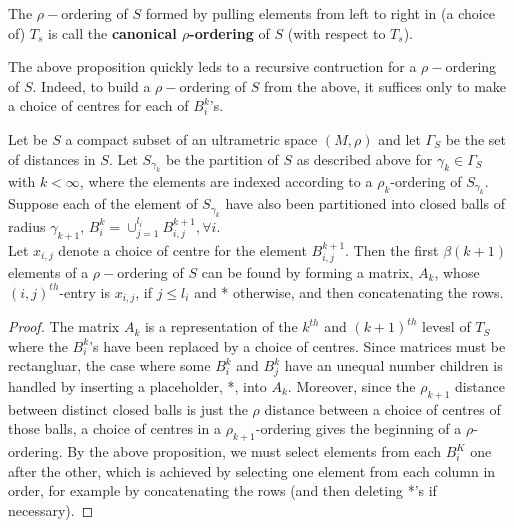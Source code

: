 \begin{definition*}
The $\rho-$ordering of $S$ formed by pulling elements from left to right in (a choice of) $T_s$ is call the \textbf{canonical $\rho$-ordering} of $S$ (with respect to $T_s$).
\end{definition*}

The above proposition quickly leds to a recursive contruction for a $\rho-$ordering of $S$. Indeed, to build a $\rho-$ordering of $S$ from the above, it suffices only to make a choice of centres for each of $B^k_i$'s.

\begin{proposition*}
Let be $S$ a compact subset of an ultrametric space $(M, \rho)$ and let $\Gamma_S$ be the set of distances in $S$. Let $S_{\gamma_k}$ be the partition of $S$ as described above for $\gamma_k \in \Gamma_S$ with $k < \infty$, where the elements are indexed according to a $\rho_k$-ordering of $S_{\gamma_k}$. Suppose each of the element of $S_{\gamma_k}$ have also been partitioned into closed balls of radius $\gamma_{k+1}$, $B^k_i =\cup_{j=1}^{l_i} B^{k+1}_{i,j}, \forall i$.\\

Let $x_{i,j}$ denote a choice of centre for the element $B^{k+1}_{i,j}$. Then the first $\beta(k+1)$ elements of a $\rho-$ordering of $S$ can be found by forming a matrix, $A_k$, whose $(i,j)^{th}$-entry is $x_{i,j}$, if $j \leq l_i$ and * otherwise, and then concatenating the rows.
\end{proposition*}


\begin{proof}
The matrix $A_k$ is a representation of the $k^{th}$ and $(k+1)^{th}$ levesl of $T_S$ where the $B^k_i$'s have been replaced by a choice of centres. Since matrices must be rectangluar, the case where some $B^k_i$ and $B^k_j$ have an unequal number children is handled by inserting a placeholder, *, into $A_k$.  Moreover, since the $\rho_{k+1}$ distance between distinct closed balls is just the $\rho$ distance between a choice of centres of those  balls, a choice of centres in a $\rho_{k+1}$-ordering gives the beginning of a $\rho$-ordering.  By the above proposition, we must select elements from each $B^K_i$ one after the other, which is achieved by selecting one element from each column in order, for example by concatenating the rows (and then deleting *'s if necessary). 
\end{proof}

